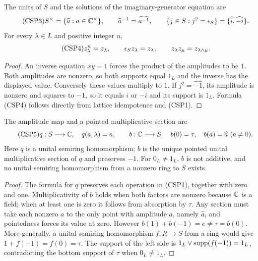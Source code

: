 \begin{lemma}\label{lem:units}
The units of $S$ and the solutions of the imaginary-generator equation are
\begin{equation}\tag{CSP3}
 S^\times=\{\widehat a:a\in\mathbb C^\times\},\qquad
 \widehat a^{-1}=\widehat{a^{-1}},\qquad
 \{j\in S:j^2=\epsilon_S\}=\{\widehat i,\widehat{-i}\}.
\end{equation}
For every $\lambda\in L$ and positive integer $n$,
\begin{equation}\tag{CSP4}
 z_\lambda^n=z_\lambda,\qquad
 \epsilon_S z_\lambda=z_\lambda,\qquad
 z_\lambda z_\mu=z_{\lambda\wedge\mu}.
\end{equation}
\end{lemma}
\begin{proof}
An inverse equation $xy=1$ forces the product of the amplitudes to be
$1$.  Both amplitudes are nonzero, so both supports equal $1_L$ and the
inverse has the displayed value.  Conversely these values multiply to
$1$.  If $j^2=\widehat{-1}$, its amplitude is nonzero and squares to
$-1$, so it equals $i$ or $-i$ and its support is $1_L$.  Formula
(CSP4) follows directly from lattice idempotence and (CSP1).
\end{proof}

\begin{proposition}\label{prop:amplitude}
The amplitude map and a pointed multiplicative section are
\begin{equation}\tag{CSP5}
 q:S\longrightarrow\mathbb C,\quad q(a,\lambda)=a,\qquad
 b:\mathbb C\longrightarrow S,\quad
 b(0)=\tau,\quad b(a)=\widehat a\ (a\ne0).
\end{equation}
Here $q$ is a unital semiring homomorphism; $b$ is the unique pointed
unital multiplicative section of $q$ and preserves $-1$.  For
$0_L\ne1_L$, $b$ is not additive, and no unital semiring homomorphism
from a nonzero ring to $S$ exists.
\end{proposition}
\begin{proof}
The formula for $q$ preserves each operation in (CSP1), together with
zero and one.  Multiplicativity of $b$ holds when both factors are
nonzero because $\mathbb C$ is a field; when at least one is zero it follows
from absorption by $\tau$.  Any section must take each nonzero $a$ to
the only point with amplitude $a$, namely $\widehat a$, and pointedness
forces its value at zero.  However
$b(1)+b(-1)=e\ne\tau=b(0)$.  More generally, a unital semiring
homomorphism $f:R\to S$ from a ring would give
$1+f(-1)=f(0)=\tau$.  The support of the left side is
$1_L\vee\operatorname{supp}(f(-1))=1_L$, contradicting the bottom support of
$\tau$ when $0_L\ne1_L$.
\end{proof}

